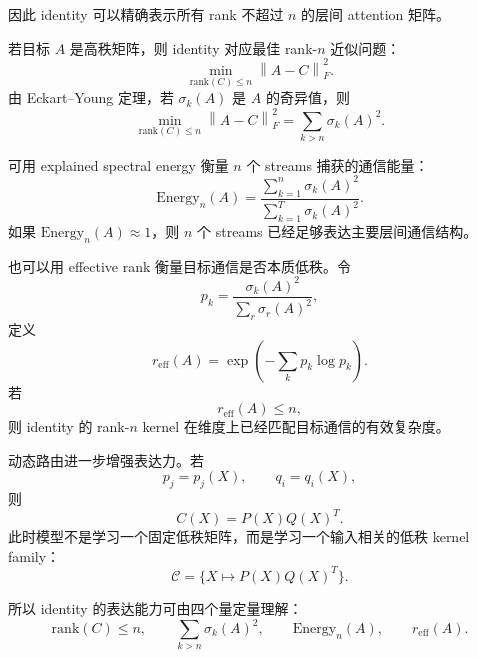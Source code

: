 \documentclass[UTF8,11pt]{ctexart}
\newcommand{\norm}[1]{\left\lVert #1 \right\rVert}
\begin{document}
因此 identity 可以精确表示所有 rank 不超过 $n$ 的层间 attention 矩阵。

若目标 $A$ 是高秩矩阵，则 identity 对应最佳 rank-$n$ 近似问题：
\begin{equation}
  \min_{\mathrm{rank}(C)\le n}
  \norm{A-C}_F^2.
\end{equation}
由 Eckart--Young 定理，若 $\sigma_k(A)$ 是 $A$ 的奇异值，则
\begin{equation}
  \min_{\mathrm{rank}(C)\le n}
  \norm{A-C}_F^2
  =
  \sum_{k>n}\sigma_k(A)^2.
\end{equation}

可用 explained spectral energy 衡量 $n$ 个 streams 捕获的通信能量：
\begin{equation}
  \mathrm{Energy}_n(A)
  =
  \frac{
  \sum_{k=1}^{n}\sigma_k(A)^2
  }{
  \sum_{k=1}^{T}\sigma_k(A)^2
  }.
\end{equation}
如果 $\mathrm{Energy}_n(A)\approx1$，则 $n$ 个 streams 已经足够表达主要层间通信结构。

也可以用 effective rank 衡量目标通信是否本质低秩。令
\begin{equation}
  p_k=
  \frac{\sigma_k(A)^2}{\sum_r\sigma_r(A)^2},
\end{equation}
定义
\begin{equation}
  r_{\mathrm{eff}}(A)
  =
  \exp\left(-\sum_k p_k\log p_k\right).
\end{equation}
若
\begin{equation}
  r_{\mathrm{eff}}(A)\le n,
\end{equation}
则 identity 的 rank-$n$ kernel 在维度上已经匹配目标通信的有效复杂度。

动态路由进一步增强表达力。若
\begin{equation}
  p_j=p_j(X),
  \qquad
  q_i=q_i(X),
\end{equation}
则
\begin{equation}
  C(X)=P(X)Q(X)^T.
\end{equation}
此时模型不是学习一个固定低秩矩阵，而是学习一个输入相关的低秩 kernel family：
\begin{equation}
  \mathcal{C}
  =
  \{X\mapsto P(X)Q(X)^T\}.
\end{equation}

所以 identity 的表达能力可由四个量定量理解：
\begin{equation}
  \mathrm{rank}(C)\le n,
  \qquad
  \sum_{k>n}\sigma_k(A)^2,
  \qquad
  \mathrm{Energy}_n(A),
  \qquad
  r_{\mathrm{eff}}(A).
\end{equation}
\end{document}
